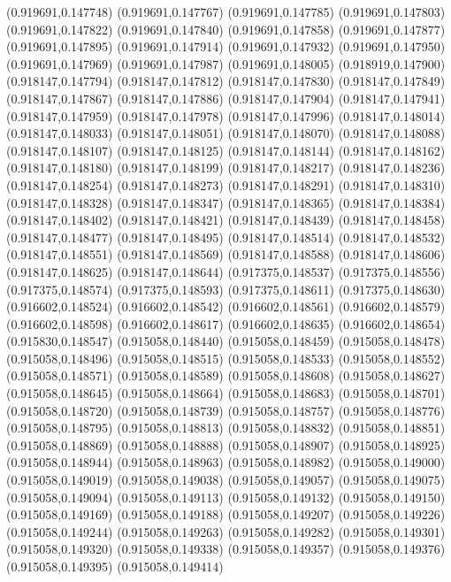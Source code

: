 (0.919691,0.147748)
(0.919691,0.147767)
(0.919691,0.147785)
(0.919691,0.147803)
(0.919691,0.147822)
(0.919691,0.147840)
(0.919691,0.147858)
(0.919691,0.147877)
(0.919691,0.147895)
(0.919691,0.147914)
(0.919691,0.147932)
(0.919691,0.147950)
(0.919691,0.147969)
(0.919691,0.147987)
(0.919691,0.148005)
(0.918919,0.147900)
(0.918147,0.147794)
(0.918147,0.147812)
(0.918147,0.147830)
(0.918147,0.147849)
(0.918147,0.147867)
(0.918147,0.147886)
(0.918147,0.147904)
(0.918147,0.147941)
(0.918147,0.147959)
(0.918147,0.147978)
(0.918147,0.147996)
(0.918147,0.148014)
(0.918147,0.148033)
(0.918147,0.148051)
(0.918147,0.148070)
(0.918147,0.148088)
(0.918147,0.148107)
(0.918147,0.148125)
(0.918147,0.148144)
(0.918147,0.148162)
(0.918147,0.148180)
(0.918147,0.148199)
(0.918147,0.148217)
(0.918147,0.148236)
(0.918147,0.148254)
(0.918147,0.148273)
(0.918147,0.148291)
(0.918147,0.148310)
(0.918147,0.148328)
(0.918147,0.148347)
(0.918147,0.148365)
(0.918147,0.148384)
(0.918147,0.148402)
(0.918147,0.148421)
(0.918147,0.148439)
(0.918147,0.148458)
(0.918147,0.148477)
(0.918147,0.148495)
(0.918147,0.148514)
(0.918147,0.148532)
(0.918147,0.148551)
(0.918147,0.148569)
(0.918147,0.148588)
(0.918147,0.148606)
(0.918147,0.148625)
(0.918147,0.148644)
(0.917375,0.148537)
(0.917375,0.148556)
(0.917375,0.148574)
(0.917375,0.148593)
(0.917375,0.148611)
(0.917375,0.148630)
(0.916602,0.148524)
(0.916602,0.148542)
(0.916602,0.148561)
(0.916602,0.148579)
(0.916602,0.148598)
(0.916602,0.148617)
(0.916602,0.148635)
(0.916602,0.148654)
(0.915830,0.148547)
(0.915058,0.148440)
(0.915058,0.148459)
(0.915058,0.148478)
(0.915058,0.148496)
(0.915058,0.148515)
(0.915058,0.148533)
(0.915058,0.148552)
(0.915058,0.148571)
(0.915058,0.148589)
(0.915058,0.148608)
(0.915058,0.148627)
(0.915058,0.148645)
(0.915058,0.148664)
(0.915058,0.148683)
(0.915058,0.148701)
(0.915058,0.148720)
(0.915058,0.148739)
(0.915058,0.148757)
(0.915058,0.148776)
(0.915058,0.148795)
(0.915058,0.148813)
(0.915058,0.148832)
(0.915058,0.148851)
(0.915058,0.148869)
(0.915058,0.148888)
(0.915058,0.148907)
(0.915058,0.148925)
(0.915058,0.148944)
(0.915058,0.148963)
(0.915058,0.148982)
(0.915058,0.149000)
(0.915058,0.149019)
(0.915058,0.149038)
(0.915058,0.149057)
(0.915058,0.149075)
(0.915058,0.149094)
(0.915058,0.149113)
(0.915058,0.149132)
(0.915058,0.149150)
(0.915058,0.149169)
(0.915058,0.149188)
(0.915058,0.149207)
(0.915058,0.149226)
(0.915058,0.149244)
(0.915058,0.149263)
(0.915058,0.149282)
(0.915058,0.149301)
(0.915058,0.149320)
(0.915058,0.149338)
(0.915058,0.149357)
(0.915058,0.149376)
(0.915058,0.149395)
(0.915058,0.149414)
